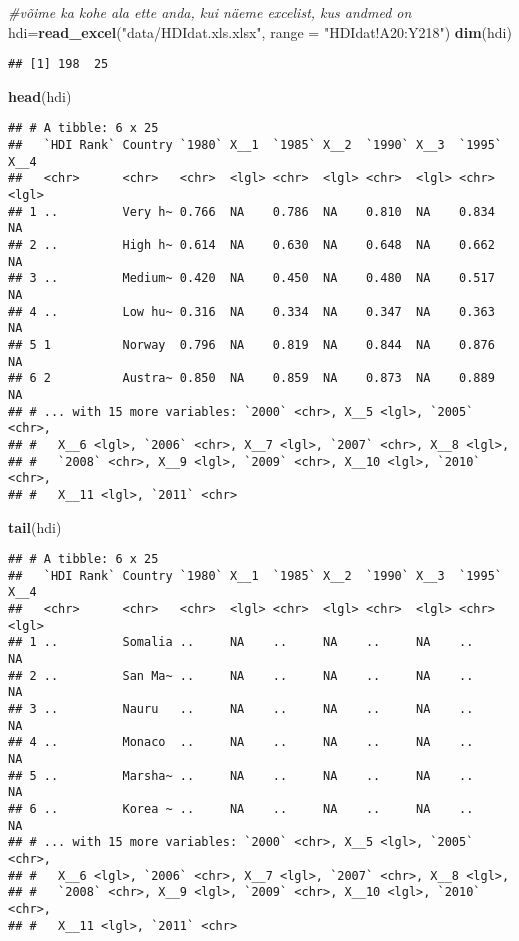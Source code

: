 \documentclass[]{article}
\newenvironment{Shaded}{\begin{snugshade}}{\end{snugshade}}
\newcommand{\KeywordTok}[1]{\textcolor[rgb]{0.13,0.29,0.53}{\textbf{#1}}}
\newcommand{\DataTypeTok}[1]{\textcolor[rgb]{0.13,0.29,0.53}{#1}}
\newcommand{\StringTok}[1]{\textcolor[rgb]{0.31,0.60,0.02}{#1}}
\newcommand{\CommentTok}[1]{\textcolor[rgb]{0.56,0.35,0.01}{\textit{#1}}}
\newcommand{\NormalTok}[1]{#1}
\begin{document}
\begin{Shaded}
\begin{Highlighting}[]
\CommentTok{#võime ka kohe ala ette anda, kui näeme excelist, kus andmed on}
\NormalTok{hdi=}\KeywordTok{read_excel}\NormalTok{(}\StringTok{"data/HDIdat.xls.xlsx"}\NormalTok{, }\DataTypeTok{range =} \StringTok{"HDIdat!A20:Y218"}\NormalTok{)}
\KeywordTok{dim}\NormalTok{(hdi)}
\end{Highlighting}
\end{Shaded}

\begin{verbatim}
## [1] 198  25
\end{verbatim}

\begin{Shaded}
\begin{Highlighting}[]
\KeywordTok{head}\NormalTok{(hdi)}
\end{Highlighting}
\end{Shaded}

\begin{verbatim}
## # A tibble: 6 x 25
##   `HDI Rank` Country `1980` X__1  `1985` X__2  `1990` X__3  `1995` X__4 
##   <chr>      <chr>   <chr>  <lgl> <chr>  <lgl> <chr>  <lgl> <chr>  <lgl>
## 1 ..         Very h~ 0.766  NA    0.786  NA    0.810  NA    0.834  NA   
## 2 ..         High h~ 0.614  NA    0.630  NA    0.648  NA    0.662  NA   
## 3 ..         Medium~ 0.420  NA    0.450  NA    0.480  NA    0.517  NA   
## 4 ..         Low hu~ 0.316  NA    0.334  NA    0.347  NA    0.363  NA   
## 5 1          Norway  0.796  NA    0.819  NA    0.844  NA    0.876  NA   
## 6 2          Austra~ 0.850  NA    0.859  NA    0.873  NA    0.889  NA   
## # ... with 15 more variables: `2000` <chr>, X__5 <lgl>, `2005` <chr>,
## #   X__6 <lgl>, `2006` <chr>, X__7 <lgl>, `2007` <chr>, X__8 <lgl>,
## #   `2008` <chr>, X__9 <lgl>, `2009` <chr>, X__10 <lgl>, `2010` <chr>,
## #   X__11 <lgl>, `2011` <chr>
\end{verbatim}

\begin{Shaded}
\begin{Highlighting}[]
\KeywordTok{tail}\NormalTok{(hdi)}
\end{Highlighting}
\end{Shaded}

\begin{verbatim}
## # A tibble: 6 x 25
##   `HDI Rank` Country `1980` X__1  `1985` X__2  `1990` X__3  `1995` X__4 
##   <chr>      <chr>   <chr>  <lgl> <chr>  <lgl> <chr>  <lgl> <chr>  <lgl>
## 1 ..         Somalia ..     NA    ..     NA    ..     NA    ..     NA   
## 2 ..         San Ma~ ..     NA    ..     NA    ..     NA    ..     NA   
## 3 ..         Nauru   ..     NA    ..     NA    ..     NA    ..     NA   
## 4 ..         Monaco  ..     NA    ..     NA    ..     NA    ..     NA   
## 5 ..         Marsha~ ..     NA    ..     NA    ..     NA    ..     NA   
## 6 ..         Korea ~ ..     NA    ..     NA    ..     NA    ..     NA   
## # ... with 15 more variables: `2000` <chr>, X__5 <lgl>, `2005` <chr>,
## #   X__6 <lgl>, `2006` <chr>, X__7 <lgl>, `2007` <chr>, X__8 <lgl>,
## #   `2008` <chr>, X__9 <lgl>, `2009` <chr>, X__10 <lgl>, `2010` <chr>,
## #   X__11 <lgl>, `2011` <chr>
\end{verbatim}
\end{document}
